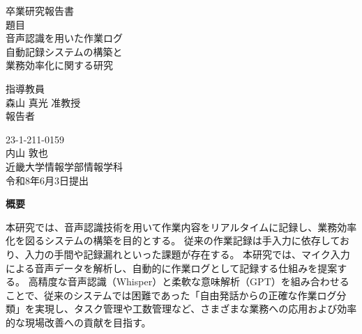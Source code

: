 \documentclass[a4paper,12pt,ja=standard,lualatex]{bxjsarticle}
\begin{document}
\pagestyle{empty}

\begin{center}
\vspace*{1cm}
\large
{\LARGE 卒業研究報告書}\\
\vspace*{0.8cm}
題目\\
\vspace*{1cm}
{\Huge{音声認識を用いた作業ログ}}\\
{\Huge{自動記録システムの構築と}}\\
{\Huge{業務効率化に関する研究}}\\
\vspace{3mm}

\vspace*{3cm}
指導教員\\
\vspace*{0.3cm}
{\LARGE 森山 真光 准教授}\\ 
\vspace*{3cm}
報告者\\
\vspace*{0.3cm}

{23-1-211-0159}\\
\vspace*{0.3cm}
{\Huge 内山 敦也}\\
\vspace*{0.5cm}
近畿大学情報学部情報学科\\
\vspace*{2cm}
令和8年6月3日提出\\
\end{center}

\newpage
\normalsize

\clearpage
\begin{center}
{\bf \Large 概要}
\end{center} 
本研究では、音声認識技術を用いて作業内容をリアルタイムに記録し、業務効率化を図るシステムの構築を目的とする。
従来の作業記録は手入力に依存しており、入力の手間や記録漏れといった課題が存在する。
本研究では、マイク入力による音声データを解析し、自動的に作業ログとして記録する仕組みを提案する。
高精度な音声認識（Whisper）と柔軟な意味解析（GPT）を組み合わせることで、従来のシステムでは困難であった「自由発話からの正確な作業ログ分類」を実現し、タスク管理や工数管理など、さまざまな業務への応用および効率的な現場改善への貢献を目指す。
\end{document}
